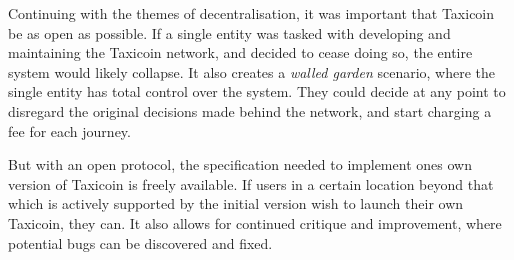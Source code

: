 Continuing with the themes of decentralisation, it was important that Taxicoin be as open as possible. If a single entity was tasked with developing and maintaining the Taxicoin network, and decided to cease doing so, the entire system would likely collapse. It also creates a \textit{walled garden} scenario, where the single entity has total control over the system. They could decide at any point to disregard the original decisions made behind the network, and start charging a fee for each journey.

But with an open protocol, the specification needed to implement ones own version of Taxicoin is freely available. If users in a certain location beyond that which is actively supported by the initial version wish to launch their own Taxicoin, they can. It also allows for continued critique and improvement, where potential bugs can be discovered and fixed.

